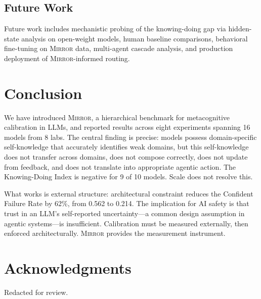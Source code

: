 \documentclass[10pt]{article}
\newcommand{\mirror}{\textsc{Mirror}}
\begin{document}
\subsection{Future Work}

Future work includes mechanistic probing of the knowing-doing gap via hidden-state analysis on open-weight models, human baseline comparisons, behavioral fine-tuning on \mirror{} data, multi-agent cascade analysis, and production deployment of \mirror{}-informed routing.

\vspace{-1mm}
\section{Conclusion}
\label{sec:conclusion}

We have introduced \mirror{}, a hierarchical benchmark for metacognitive
calibration in LLMs, and reported results across eight experiments spanning 16
models from 8 labs. The central finding is precise: models possess domain-specific
self-knowledge that accurately identifies weak domains, but this self-knowledge
does not transfer across domains, does not compose correctly, does not update from
feedback, and does not translate into appropriate agentic action. The Knowing-Doing
Index is negative for 9 of 10 models. Scale does not resolve this.

What works is external structure: architectural constraint reduces the Confident
Failure Rate by 62\%, from 0.562 to 0.214. The implication for AI safety is that
trust in an LLM's self-reported uncertainty---a common design assumption in agentic
systems---is insufficient. Calibration must be measured externally, then enforced
architecturally. \mirror{} provides the measurement instrument.

\section*{Acknowledgments}

Redacted for review.

\FloatBarrier


\end{document}
